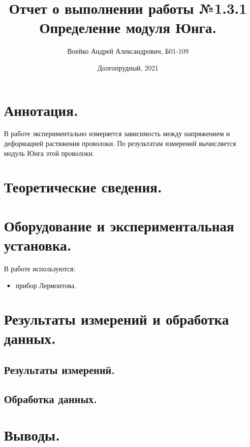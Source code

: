 \documentclass[a4paper,11pt]{article}
\title{Отчет о выполнении работы №1.3.1\\Определение модуля Юнга.}
\author{Воейко Андрей Александрович, Б01-109}
\date{Долгопрудный, 2021}
\begin{document}
\maketitle
\newpage
\section{Аннотация.}
В работе экспериментально измеряется зависимость между напряжением и деформацией  растяжения проволоки. По результатам измерений вычисляется модуль Юнга этой проволоки.
\section{Теоретические сведения.}

\section{Оборудование и экспериментальная установка.}
В работе используются:
\begin{itemize}
        \item прибор Лермонтова.
\end{itemize}
\section{Результаты измерений и обработка данных.}
\subsection{Результаты измерений.}
\subsection{Обработка данных.}
\section{Выводы.}
\end{document}
